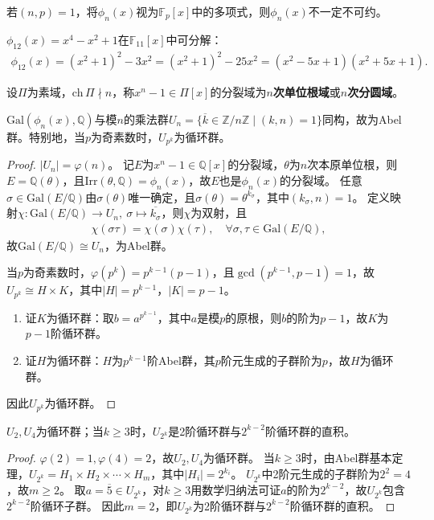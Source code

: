 \documentclass[../../main.tex]{subfiles}%
\begin{document}
\begin{remark}
若$(n,p)=1$，将$\phi_n(x)$视为$\mathbb{F}_p[x]$中的多项式，则$\phi_n(x)$不一定不可约。
\end{remark}

\begin{example}
$\phi_{12}(x)=x^4-x^2+1$在$\mathbb{F}_{11}[x]$中可分解：
\begin{align*}
\phi_{12}(x)=(x^2+1)^2-3x^2=(x^2+1)^2-25x^2=(x^2-5x+1)(x^2+5x+1).
\end{align*}
\end{example}

\begin{definition}
设$\Pi$为素域，$\mathrm{ch}\,\Pi\nmid n$，称$x^n-1\in\Pi[x]$的分裂域为\textbf{$n$次单位根域}或\textbf{$n$次分圆域}。
\end{definition}

\begin{theorem}
$\mathrm{Gal}(\phi_n(x),\mathbb{Q})$与模$n$的乘法群$U_n=\{\overline{k}\in\mathbb{Z}/n\mathbb{Z}\mid (k,n)=1\}$同构，故为Abel群。特别地，当$p$为奇素数时，$U_{p^k}$为循环群。
\end{theorem}
\begin{proof}
$|U_n|=\varphi(n)$。
记$E$为$x^n-1\in\mathbb{Q}[x]$的分裂域，$\theta$为$n$次本原单位根，则$E=\mathbb{Q}(\theta)$，且$\mathrm{Irr}(\theta,\mathbb{Q})=\phi_n(x)$，故$E$也是$\phi_n(x)$的分裂域。
任意$\sigma\in\mathrm{Gal}(E/\mathbb{Q})$由$\sigma(\theta)$唯一确定，且$\sigma(\theta)=\theta^{k_\sigma}$，其中$(k_\sigma,n)=1$。
定义映射$\chi:\mathrm{Gal}(E/\mathbb{Q})\to U_n,\ \sigma\mapsto \overline{k_\sigma}$，则$\chi$为双射，且
\begin{align*}
\chi(\sigma\tau)=\chi(\sigma)\chi(\tau),\quad \forall\sigma,\tau\in\mathrm{Gal}(E/\mathbb{Q}),
\end{align*}
故$\mathrm{Gal}(E/\mathbb{Q})\cong U_n$，为Abel群。

当$p$为奇素数时，$\varphi(p^k)=p^{k-1}(p-1)$，且$\gcd(p^{k-1},p-1)=1$，故$U_{p^k}\cong H\times K$，其中$|H|=p^{k-1}$，$|K|=p-1$。
\begin{enumerate}[(1)]
\item 证$K$为循环群：取$b=a^{p^{k-1}}$，其中$a$是模$p$的原根，则$b$的阶为$p-1$，故$K$为$p-1$阶循环群。
\item 证$H$为循环群：$H$为$p^{k-1}$阶Abel群，其$p$阶元生成的子群阶为$p$，故$H$为循环群。
\end{enumerate}
因此$U_{p^k}$为循环群。
\end{proof}

\begin{theorem}
$U_2,U_4$为循环群；当$k\geqslant3$时，$U_{2^k}$是2阶循环群与$2^{k-2}$阶循环群的直积。
\end{theorem}
\begin{proof}
$\varphi(2)=1,\varphi(4)=2$，故$U_2,U_4$为循环群。
当$k\geqslant3$时，由Abel群基本定理，$U_{2^k}=H_1\times H_2\times\cdots\times H_m$，其中$|H_i|=2^{k_i}$。
$U_{2^k}$中2阶元生成的子群阶为$2^2=4$，故$m\geqslant2$。
取$a=\overline{5}\in U_{2^k}$，对$k\geqslant3$用数学归纳法可证$a$的阶为$2^{k-2}$，故$U_{2^k}$包含$2^{k-2}$阶循环子群。
因此$m=2$，即$U_{2^k}$为2阶循环群与$2^{k-2}$阶循环群的直积。
\end{proof}
\end{document}
